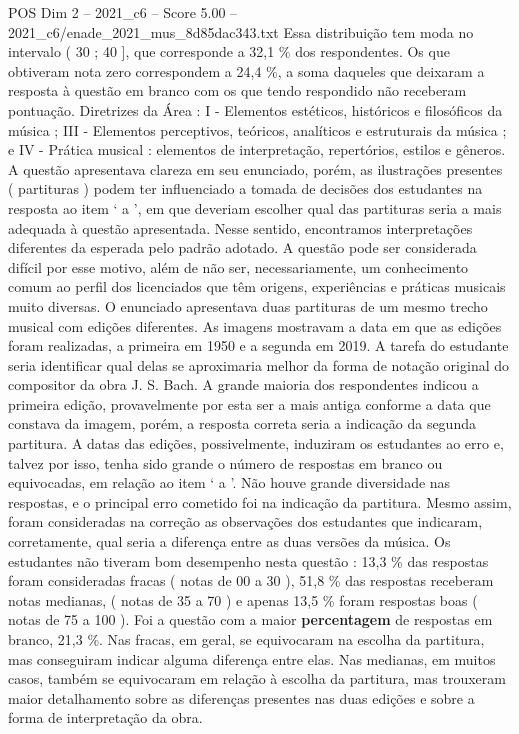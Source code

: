 \begin{textsample}{POS Dim 2 – 2021\_c6 – Score 5.00 – 2021\_c6/enade\_2021\_mus\_8d85dac343.txt}
Essa distribuição tem moda no intervalo ( 30 ; 40 ], que corresponde a 32,1 \% dos respondentes.
Os que obtiveram nota zero correspondem a 24,4 \%, a soma daqueles que deixaram a resposta à questão em branco com os que tendo respondido não receberam pontuação.
Diretrizes da Área : I - Elementos estéticos, históricos e filosóficos da música ; III - Elementos perceptivos, teóricos, analíticos e estruturais da música ; e IV - Prática musical : elementos de interpretação, repertórios, estilos e gêneros.
A questão apresentava clareza em seu enunciado, porém, as ilustrações presentes ( partituras ) podem ter influenciado a tomada de decisões dos estudantes na resposta ao item ‘ a ’, em que deveriam escolher qual das partituras seria a mais adequada à questão apresentada.
Nesse sentido, encontramos interpretações diferentes da esperada pelo padrão adotado.
A questão pode ser considerada difícil por esse motivo, além de não ser, necessariamente, um conhecimento comum ao perfil dos licenciados que têm origens, experiências e práticas musicais muito diversas.
O enunciado apresentava duas partituras de um mesmo trecho musical com edições diferentes.
As imagens mostravam a data em que as edições foram realizadas, a primeira em 1950 e a segunda em 2019.
A tarefa do estudante seria identificar qual delas se aproximaria melhor da forma de notação original do compositor da obra J.
S.
Bach.
A grande maioria dos respondentes indicou a primeira edição, provavelmente por esta ser a mais antiga conforme a data que constava da imagem, porém, a resposta correta seria a indicação da segunda partitura.
A datas das edições, possivelmente, induziram os estudantes ao erro e, talvez por isso, tenha sido grande o número de respostas em branco ou equivocadas, em relação ao item ‘ a ’.
Não houve grande diversidade nas respostas, e o principal erro cometido foi na indicação da partitura.
Mesmo assim, foram consideradas na correção as observações dos estudantes que indicaram, corretamente, qual seria a diferença entre as duas versões da música.
Os estudantes não tiveram bom desempenho nesta questão : 13,3 \% das respostas foram consideradas fracas ( notas de 00 a 30 ), 51,8 \% das respostas receberam notas medianas, ( notas de 35 a 70 ) e apenas 13,5 \% foram respostas boas ( notas de 75 a 100 ).
Foi a questão com a maior \textbf{percentagem} de respostas em branco, 21,3 \%.
Nas fracas, em geral, se equivocaram na escolha da partitura, mas conseguiram indicar alguma diferença entre elas.
Nas medianas, em muitos casos, também se equivocaram em relação à escolha da partitura, mas trouxeram maior detalhamento sobre as diferenças presentes nas duas edições e sobre a forma de interpretação da obra.

\end{textsample}
